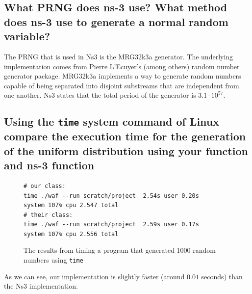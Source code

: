 \documentclass[a4paper, titlepage,12pt]{article}
\begin{document}
		\subsection{What PRNG does ns-3 use?  What method does ns-3 use to generate a normal random variable?}
		The PRNG that is used in Ns3 is the MRG32k3a generator\cite{ns3-random}. The underlying implementation comes from Pierre L'Ecuyer's (among others) random number generator package\cite{random-pierre}.
		MRG32k3a implements a way to generate random numbers capable of being separated into disjoint substreams that are independent from one another. Ns3 states that the total period of the generator is $3.1 \cdot 10^{57}$\cite{ns3-random}.
		\subsection{Using the \lstinline{time} system command of Linux compare the execution time for the generation of the uniform distribution using your function and ns-3 function}

		\begin{figure}[h!]
			\begin{center}
			\begin{lstlisting}
# our class: 
time ./waf --run scratch/project  2.54s user 0.20s 
system 107% cpu 2.547 total
# their class: 
time ./waf --run scratch/project  2.59s user 0.17s 
system 107% cpu 2.556 total
			\end{lstlisting}
			\caption{The results from timing a program that generated 1000 random numbers using \lstinline{time}}
			\end{center}
		\end{figure}
		\pagebreak
			As we can see, our implementation is slightly faster (around $0.01$ seconds) than the Ns3 implementation.
\end{document}
